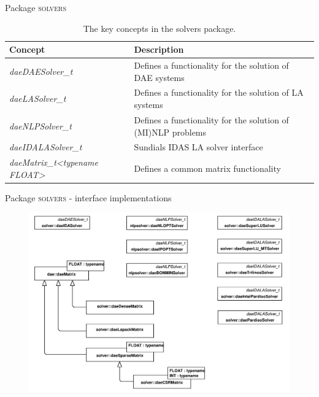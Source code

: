\documentclass[compress,newPxFont,sthlmFooter]{beamer}
\begin{document}
\begin{frame}{Package \textsc{solvers}}
\scriptsize
{
\begin{table}
  \caption*{The key concepts in the \alert{solvers} package.}
  \begin{tabularx}{\linewidth}{l>{\raggedright}X}
    \toprule
    \textcolor{sthlmRed}{\textbf{Concept}} & \textcolor{sthlmRed}{\textbf{Description}} \tabularnewline
    \midrule
    \textcolor{sthlmRed}{\textit{daeDAESolver\_t}} & Defines a functionality for the solution of DAE systems \tabularnewline 
    \textcolor{sthlmRed}{\textit{daeLASolver\_t}} & Defines a functionality for the solution of LA systems \tabularnewline
    \textcolor{sthlmRed}{\textit{daeNLPSolver\_t}} & Defines a functionality for the solution of (MI)NLP problems \tabularnewline
    \textcolor{sthlmRed}{\textit{daeIDALASolver\_t}} & Sundials IDAS LA solver interface \tabularnewline
    \midrule
    \textcolor{sthlmRed}{\textit{daeMatrix\_t<typename FLOAT>}} & Defines a common matrix functionality \tabularnewline
    \bottomrule
  \end{tabularx}
\end{table}
}
\end{frame}

\begin{frame}{Package \textsc{solvers} - interface implementations}
    \begin{center}
        \begin{figure}
            \includegraphics[width=0.75\paperwidth]{Supplemental_Figure_S5.png}      
        \end{figure}
    \end{center}
\end{frame}
\end{document}
